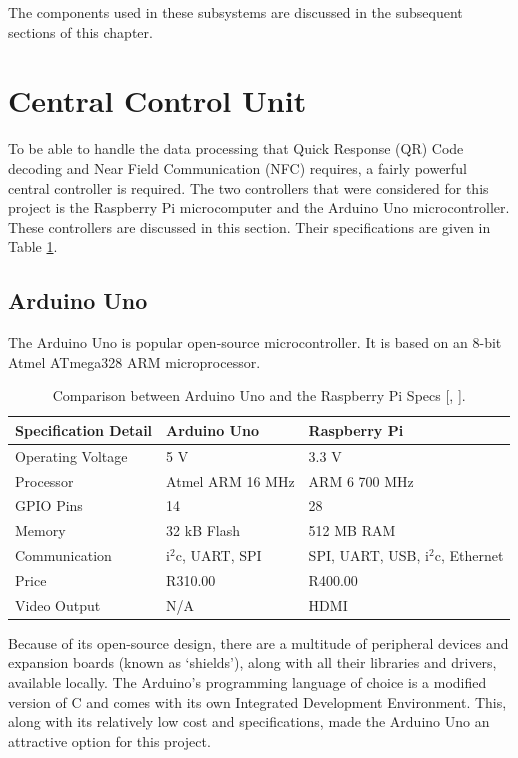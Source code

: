 The components used in these subsystems are discussed in the subsequent sections of this
chapter.

\section{Central Control Unit}

To be able to handle the data processing that Quick Response (QR) Code decoding
and Near Field Communication (NFC) requires, a fairly powerful central controller
is required. The two controllers  that were considered for this project is the Raspberry
Pi microcomputer and the Arduino Uno microcontroller. These controllers are discussed in
this section. Their specifications are given in Table \ref{tab:arduino-raspi-specs}.

\subsection{Arduino Uno}

The Arduino Uno is popular open-source microcontroller. It is based on an 8-bit
Atmel ATmega328 ARM microprocessor.

\begin{table}
\footnotesize
\centering
\caption[Comparison between Arduino Uno and the Raspberry Pi Specs.]{Comparison between
Arduino Uno and the Raspberry Pi Specs [\cite{manual:arduino-specs},
\cite{website:raspi-specs}].}
  \begin{tabular}{|l|l|l|}
  \hline
    \textbf{Specification Detail} & \textbf{Arduino Uno} & \textbf{Raspberry Pi}
    \\\hline\hline Operating Voltage & 5 V & 3.3 V \\\hline
    Processor & Atmel ARM \@ 16 MHz &  ARM 6 \@ 700 MHz \\\hline
    GPIO Pins & 14 & 28 \\\hline
    Memory & 32 kB Flash & 512 MB RAM\\\hline
    Communication & i$^2$c, UART, SPI & SPI, UART, USB, i$^2$c, Ethernet \\\hline
    Price & R310.00 & R400.00 \\\hline
    Video Output & N/A & HDMI \\\hline
  \end{tabular}
  \label{tab:arduino-raspi-specs}
\end{table}

Because of its open-source design, there are a multitude of peripheral devices and expansion
boards (known as `shields'), along with all their libraries and drivers,
available locally. The Arduino's programming language of choice is a modified version of
C and comes with its own Integrated Development Environment. This, along
with its relatively low cost and specifications, made the Arduino Uno
an attractive option for this project.

